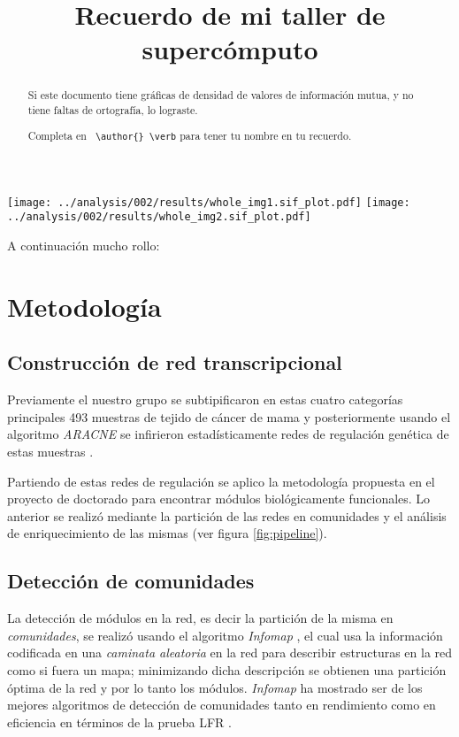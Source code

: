 \documentclass[a4paper,12pt]{article}
\title{\textbf{Recuerdo de mi taller de supercómputo}}
\author{}
\begin{document}
\maketitle

\begin{abstract}
Si este documento tiene gráficas de densidad de valores de información mutua,
y no tiene faltas de ortografía, lo lograste.

Completa en \verb+ \author{} \verb+ para tener tu nombre en tu recuerdo.
\end{abstract}

\texttt{[image: ../analysis/002/results/whole\_img1.sif\_plot.pdf]}
\texttt{[image: ../analysis/002/results/whole\_img2.sif\_plot.pdf]}

A continuación mucho rollo:

\section{Metodología}

\subsection{Construcción de red transcripcional}

Previamente el nuestro grupo se subtipificaron en estas cuatro categorías principales 493 muestras de tejido de cáncer de mama \cite{AndaJauregui2015} y posteriormente usando el algoritmo \emph{ARACNE} \cite{Margolin2006} se infirieron estadísticamente redes de regulación genética de estas muestras \cite{AndaJauregui2016}.

Partiendo de estas redes de regulación se aplico la metodología propuesta en el proyecto de doctorado \cite{Alcala2016} para encontrar módulos biológicamente funcionales. Lo anterior se realizó mediante la partición de las redes en comunidades y el análisis de enriquecimiento de las mismas (ver figura \ref{fig:pipeline}).

\subsection{Detección de comunidades}

La detección de módulos en la red, es decir la partición de la misma en \emph{comunidades}, se realizó usando el algoritmo \emph{Infomap} \cite{Rosvall2008}, el cual usa la información codificada en una \emph{caminata aleatoria} en la red para describir estructuras en la red como si fuera un mapa; minimizando dicha descripción se obtienen una partición óptima de la red y por lo tanto los módulos. \emph{Infomap} ha mostrado ser de los mejores algoritmos de detección de comunidades tanto en rendimiento como en eficiencia \cite{lancichinetti2009} en términos de la prueba LFR \cite{Lancichinetti2008}.
\end{document}
